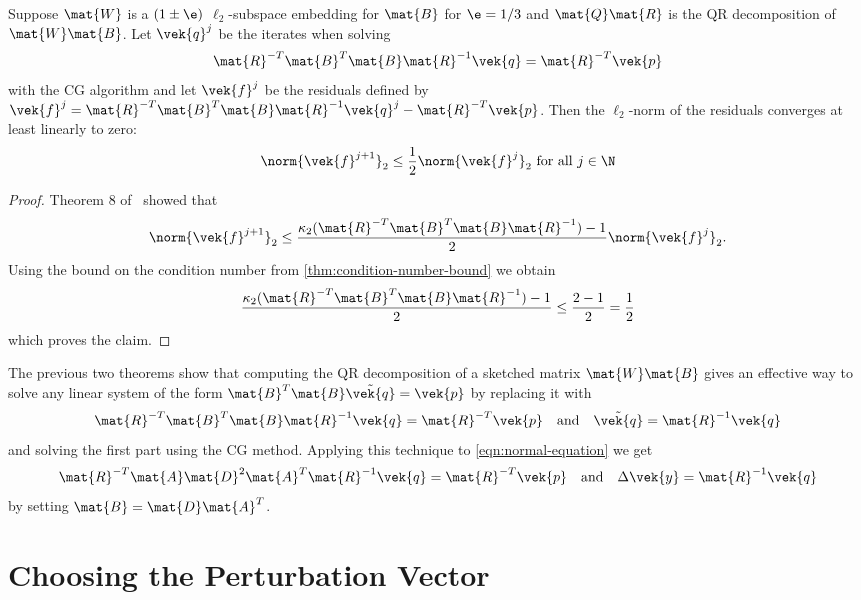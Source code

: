 \begin{lemma}\label{thm:cg-residual-bound}
Suppose \(\mat{W}\) is a \((1\pm\e)\) \(\ell_2\)-subspace embedding for \(\mat{B}\) for \(\e = 1/3\) and \(\mat{Q}\mat{R}\) is the QR decomposition of \(\mat{W}\mat{B}\).
Let \(\vek{q}^j\) be the iterates when solving \[ \mat{R}^{-T} \mat{B}^T \mat{B} \mat{R}^{-1} \vek{q} = \mat{R}^{-T} \vek{p} \] with the CG algorithm and let \(\vek{f}^j\) be the residuals defined by
\( \vek{f}^j = \mat{R}^{-T} \mat{B}^T \mat{B} \mat{R}^{-1} \vek{q}^j - \mat{R}^{-T} \vek{p} \).
Then the \(\ell_2\)-norm of the residuals converges at least linearly to zero:
\[ \norm{\vek{f}^{j+1}}_2 \leq \frac{1}{2} \norm{ \vek{f}^j }_2 \text{ for all } j \in \N \]
\end{lemma}
\begin{proof}
Theorem 8 of~\cite{Bouyouli-ConjugateGradientConvergence} showed that
\[ \norm{\vek{f}^{j+1}}_2 \leq \frac{\kappa_2(\mat{R}^{-T} \mat{B}^T \mat{B} \mat{R}^{-1}) - 1}{2} \norm{\vek{f}^j}_2 .\]
Using the bound on the condition number from \cref{thm:condition-number-bound} we obtain
\[ \frac{\kappa_2(\mat{R}^{-T} \mat{B}^T \mat{B} \mat{R}^{-1}) - 1}{2}
   \leq \frac{2 - 1}{2} = \frac{1}{2} \]
which proves the claim.
\end{proof}

The previous two theorems show that computing the QR decomposition of a sketched matrix \(\mat{W}\mat{B}\) gives an effective way to solve any linear system of the form
\( \mat{B}^T \mat{B}\tilde{\vek{q}} = \vek{p} \)
by replacing it with
\begin{equation}\label{eqn:general-preconditioned-linear-system}
  \mat{R}^{-T}\mat{B}^T\mat{B}\mat{R}^{-1}\vek{q} = \mat{R}^{-T}\vek{p} \quad \text{and} \quad \tilde{\vek{q}} = \mat{R}^{-1}\vek{q}
\end{equation}
and solving the first part using the CG method.
Applying this technique to \cref{eqn:normal-equation} we get
\begin{equation}\label{eqn:preconditioned-normal-equation}
  \mat{R}^{-T}\mat{A}\mat{D}^2\mat{A}^T\mat{R}^{-1}\vek{q} = \mat{R}^{-T}\vek{p} \quad \text{and} \quad \Delta\vek{y} = \mat{R}^{-1}\vek{q}
\end{equation}
by setting \(\mat{B} = \mat{D}\mat{A}^T\).

\section{Choosing the Perturbation Vector}\label{sec:sektching-perturbation-vector}

